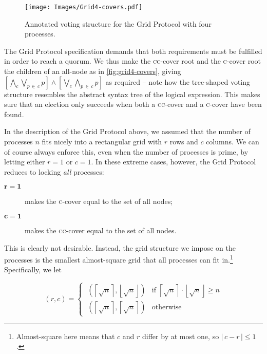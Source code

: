 \documentclass[11pt,chapterprefix=true,toc=bibliography,numbers=noendperiod,
               footnotes=multiple,twoside]{scrreprt}
\begin{document}
\begin{figure}[h]
    \centering
    \texttt{[image: Images/Grid4-covers.pdf]}
    \caption{Annotated voting structure for the Grid Protocol with four processes.}
    \label{fig:grid4-covers}
\end{figure}

The Grid Protocol specification demands that both requirements must be fulfilled in order to reach a quorum. We thus make the \textsc{cc}-cover root and the \textsc{c}-cover root the children of an all-node as in \autoref{fig:grid4-covers}, giving \( \left[ \bigwedge_c \bigvee_{p\,\in\,c} p \right] \wedge \left[ \bigvee_c \bigwedge_{p\,\in\,c} p \right] \) as required -- note how the tree-shaped voting structure resembles the abstract syntax tree of the logical expression. This makes sure that an election only succeeds when both a \textsc{cc}-cover and a \textsc{c}-cover have been found.


In the description of the Grid Protocol above, we assumed that the number of processes \(n\) fits nicely into a rectangular grid with \(r\) rows and \(c\) columns. We can of course always enforce this, even when the number of processes is prime, by letting either \(r = 1\) or \(c = 1\). In these extreme cases, however, the Grid Protocol reduces to locking \emph{all} processes:

\begin{description}
    \item[\(\mathbf{r = 1}\)] makes the \textsc{c}-cover equal to the set of all nodes;
    \item[\(\mathbf{c = 1}\)] makes the \textsc{cc}-cover equal to the set of all nodes.
\end{description}

This is clearly not desirable. Instead, the grid structure we impose on the processes is the smallest almost-square grid that all processes can fit in.\footnote{Almost-square here means that \(c\) and \(r\) differ by at most one, so \(|\,c - r\,| \leq 1\).} Specifically, we let

\[ (r, c) =
    \begin{cases}
        \;\left( \left\lceil \sqrt{n} \right\rceil,
                 \left\lfloor \sqrt{n} \right\rfloor \right)
                 & \text{if } \left\lceil \sqrt{n} \right\rceil
                        \cdot \left\lfloor \sqrt{n} \right\rfloor \geq n \\[0.5em]
        \;\left( \left\lceil \sqrt{n} \right\rceil,
                 \left\lceil \sqrt{n} \right\rceil \right) & \text{otherwise}
    \end{cases}
\]
\end{document}

